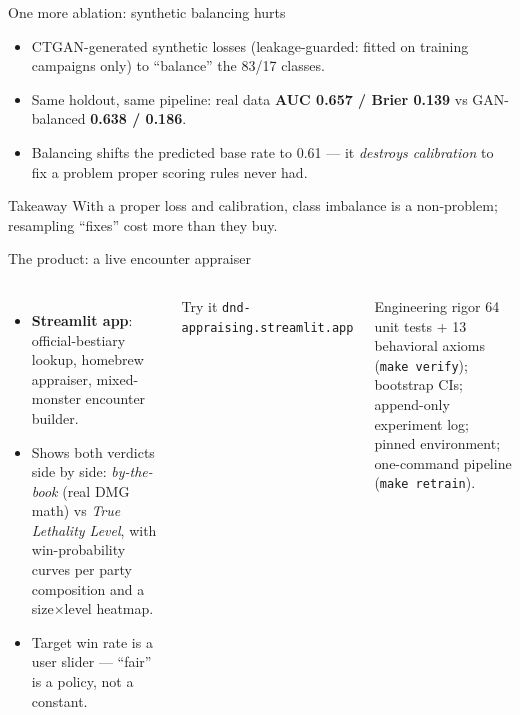 \documentclass[aspectratio=169,11pt]{beamer}
\begin{document}
\begin{frame}{One more ablation: synthetic balancing hurts}
  \begin{itemize}
    \item CTGAN-generated synthetic losses (leakage-guarded: fitted on training campaigns only) to ``balance'' the 83/17 classes.
    \item Same holdout, same pipeline: real data \textbf{AUC 0.657 / Brier 0.139} vs GAN-balanced \textbf{0.638 / 0.186}.
    \item Balancing shifts the predicted base rate to 0.61 — it \emph{destroys calibration} to fix a problem proper scoring rules never had.
  \end{itemize}
  \begin{block}{Takeaway}
    With a proper loss and calibration, class imbalance is a non-problem; resampling ``fixes'' cost more than they buy.
  \end{block}
\end{frame}

\begin{frame}{The product: a live encounter appraiser}
  \begin{columns}[T]
      \begin{itemize}
        \item \textbf{Streamlit app}: official-bestiary lookup, homebrew appraiser, mixed-monster encounter builder.
        \item Shows both verdicts side by side: \emph{by-the-book} (real DMG math) vs \emph{True Lethality Level}, with win-probability curves per party composition and a size$\times$level heatmap.
        \item Target win rate is a user slider — ``fair'' is a policy, not a constant.
      \end{itemize}
      \begin{block}{Try it}
        \centering\texttt{dnd-appraising.streamlit.app}
      \end{block}
      \begin{exampleblock}{Engineering rigor}
        \small 64 unit tests + 13 behavioral axioms (\texttt{make verify}); bootstrap CIs; append-only experiment log; pinned environment; one-command pipeline (\texttt{make retrain}).
      \end{exampleblock}
  \end{columns}
\end{frame}
\end{document}
